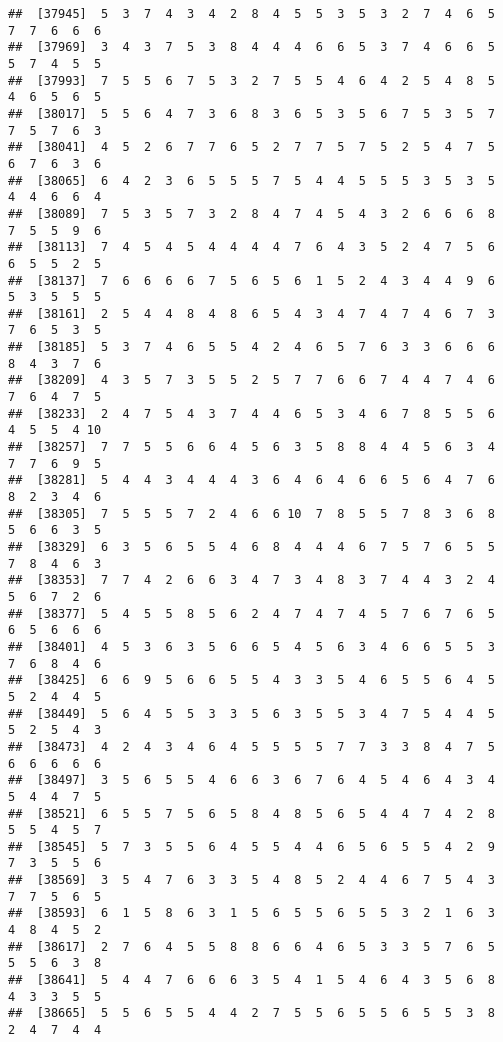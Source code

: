 \documentclass[
]{book}
\begin{document}
\begin{verbatim}
##  [37945]  5  3  7  4  3  4  2  8  4  5  5  3  5  3  2  7  4  6  5  7  7  6  6  6
##  [37969]  3  4  3  7  5  3  8  4  4  4  6  6  5  3  7  4  6  6  5  5  7  4  5  5
##  [37993]  7  5  5  6  7  5  3  2  7  5  5  4  6  4  2  5  4  8  5  4  6  5  6  5
##  [38017]  5  5  6  4  7  3  6  8  3  6  5  3  5  6  7  5  3  5  7  7  5  7  6  3
##  [38041]  4  5  2  6  7  7  6  5  2  7  7  5  7  5  2  5  4  7  5  6  7  6  3  6
##  [38065]  6  4  2  3  6  5  5  5  7  5  4  4  5  5  5  3  5  3  5  4  4  6  6  4
##  [38089]  7  5  3  5  7  3  2  8  4  7  4  5  4  3  2  6  6  6  8  7  5  5  9  6
##  [38113]  7  4  5  4  5  4  4  4  4  7  6  4  3  5  2  4  7  5  6  6  5  5  2  5
##  [38137]  7  6  6  6  6  7  5  6  5  6  1  5  2  4  3  4  4  9  6  5  3  5  5  5
##  [38161]  2  5  4  4  8  4  8  6  5  4  3  4  7  4  7  4  6  7  3  7  6  5  3  5
##  [38185]  5  3  7  4  6  5  5  4  2  4  6  5  7  6  3  3  6  6  6  8  4  3  7  6
##  [38209]  4  3  5  7  3  5  5  2  5  7  7  6  6  7  4  4  7  4  6  7  6  4  7  5
##  [38233]  2  4  7  5  4  3  7  4  4  6  5  3  4  6  7  8  5  5  6  4  5  5  4 10
##  [38257]  7  7  5  5  6  6  4  5  6  3  5  8  8  4  4  5  6  3  4  7  7  6  9  5
##  [38281]  5  4  4  3  4  4  4  3  6  4  6  4  6  6  5  6  4  7  6  8  2  3  4  6
##  [38305]  7  5  5  5  7  2  4  6  6 10  7  8  5  5  7  8  3  6  8  5  6  6  3  5
##  [38329]  6  3  5  6  5  5  4  6  8  4  4  4  6  7  5  7  6  5  5  7  8  4  6  3
##  [38353]  7  7  4  2  6  6  3  4  7  3  4  8  3  7  4  4  3  2  4  5  6  7  2  6
##  [38377]  5  4  5  5  8  5  6  2  4  7  4  7  4  5  7  6  7  6  5  6  5  6  6  6
##  [38401]  4  5  3  6  3  5  6  6  5  4  5  6  3  4  6  6  5  5  3  7  6  8  4  6
##  [38425]  6  6  9  5  6  6  5  5  4  3  3  5  4  6  5  5  6  4  5  5  2  4  4  5
##  [38449]  5  6  4  5  5  3  3  5  6  3  5  5  3  4  7  5  4  4  5  5  2  5  4  3
##  [38473]  4  2  4  3  4  6  4  5  5  5  5  7  7  3  3  8  4  7  5  6  6  6  6  6
##  [38497]  3  5  6  5  5  4  6  6  3  6  7  6  4  5  4  6  4  3  4  5  4  4  7  5
##  [38521]  6  5  5  7  5  6  5  8  4  8  5  6  5  4  4  7  4  2  8  5  5  4  5  7
##  [38545]  5  7  3  5  5  6  4  5  5  4  4  6  5  6  5  5  4  2  9  7  3  5  5  6
##  [38569]  3  5  4  7  6  3  3  5  4  8  5  2  4  4  6  7  5  4  3  7  7  5  6  5
##  [38593]  6  1  5  8  6  3  1  5  6  5  5  6  5  5  3  2  1  6  3  4  8  4  5  2
##  [38617]  2  7  6  4  5  5  8  8  6  6  4  6  5  3  3  5  7  6  5  5  5  6  3  8
##  [38641]  5  4  4  7  6  6  6  3  5  4  1  5  4  6  4  3  5  6  8  4  3  3  5  5
##  [38665]  5  5  6  5  5  4  4  2  7  5  5  6  5  5  6  5  5  3  8  2  4  7  4  4

\end{verbatim}
\end{document}
